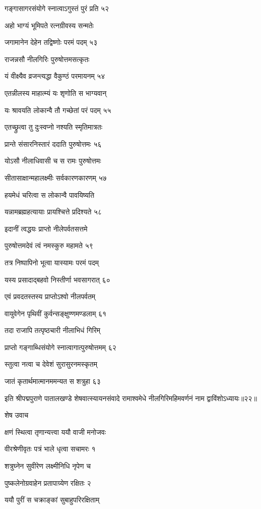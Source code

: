 गङ्गासागरसंयोगे स्नात्वाऽगुस्तं पुरं प्रति ५२

अहो भाग्यं भूमिपते रत्नग्रीवस्य सन्मतेः

जगामानेन देहेन तद्विष्णोः परमं पदम् ५३

राजन्नसौ नीलगिरिः पुरुषोत्तमसत्कृतः

यं वीक्ष्यैव व्रजन्त्यद्धा वैकुण्ठं परमायनम् ५४

एतन्नीलस्य माहात्म्यं यः शृणोति स भाग्यवान्

यः श्रावयति लोकान्वै तौ गच्छेतां परं पदम् ५५

एतच्छ्रुत्वा तु दुःस्वप्नो नश्यति स्मृतिमात्रतः

प्रान्ते संसारनिस्तारं ददाति पुरुषोत्तमः ५६

योऽसौ नीलाधिवासी च स रामः पुरुषोत्तमः

सीतासाक्षान्महालक्ष्मीः सर्वकारणकारणम् ५७

हयमेधं चरित्वा स लोकान्वै पावयिष्यति

यन्नामब्रह्महत्यायाः प्रायश्चित्ते प्रदिश्यते ५८

इदानीं त्वद्धयः प्राप्तो नीलेपर्वतसत्तमे

पुरुषोत्तमदेवं त्वं नमस्कुरु महामते ५९

तत्र निष्पापिनो भूत्वा यास्यामः परमं पदम्

यस्य प्रसादाद्बहवो निस्तीर्णा भवसागरात् ६०

एवं प्रवदतस्तस्य प्राप्तोऽश्वो नीलपर्वतम्

वायुवेगेन पृथिवीं कुर्वन्सङ्क्षुण्णमण्डलाम् ६१

तदा राजापि तत्पृष्ठचारी नीलाभिधं गिरिम्

प्राप्तो गङ्गाब्धिसंयोगे स्नात्वागात्पुरुषोत्तमम् ६२

स्तुत्वा नत्वा च देवेशं सुरासुरनमस्कृतम्

जातं कृतार्थमात्मानममन्यत स शत्रुहा ६३

इति श्रीपद्मपुराणे पातालखण्डे शेषवात्स्यायनसंवादे रामाश्वमेधे नीलगिरिमहिमवर्णनं नाम द्वाविंशोऽध्यायः॥२२॥


शेष उवाच

क्षणं स्थित्वा तृणान्यत्त्वा ययौ वाजी मनोजवः

वीरश्रेणीवृतः पत्रं भाले धृत्वा सचामरः १

शत्रुघ्नेन सुवीरेण लक्ष्मीनिधि नृपेण च

पुष्कलेनोग्रवाहेन प्रतापाग्र्येण रक्षितः २

ययौ पुरीं स चक्राङ्कां सुबाहुपरिरक्षिताम्

